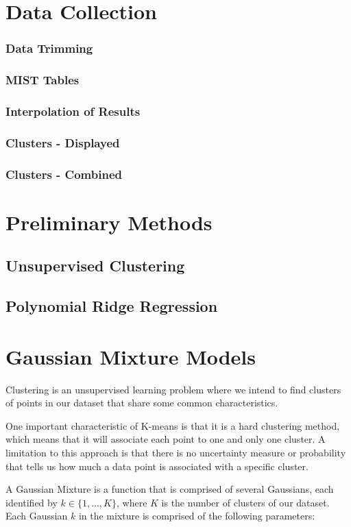\documentclass[fleqn,usenatbib]{mnras}
\begin{document}
\section{Data Collection}
\subsubsection{Data Trimming}
\subsubsection{MIST Tables}
\subsubsection{Interpolation of Results}
\subsubsection{Clusters - Displayed}
\subsubsection{Clusters - Combined}


\section{Preliminary Methods}
\subsection{Unsupervised Clustering}
\subsection{Polynomial Ridge Regression}

\section{Gaussian Mixture Models}
Clustering is an unsupervised learning problem where we intend to find clusters of points in our dataset that share some common characteristics.

One important characteristic of K-means is that it is a hard clustering method, which means that it will associate each point to one and only one cluster.
A limitation to this approach is that there is no uncertainty measure or probability that tells us how much a data point is associated with a specific cluster.

A Gaussian Mixture is a function that is comprised of several Gaussians, each identified by $k \in \{1,\dots, K\}$, where $K$ is the number of clusters of our dataset. Each Gaussian $k$ in the mixture is comprised of the following parameters:
\end{document}
